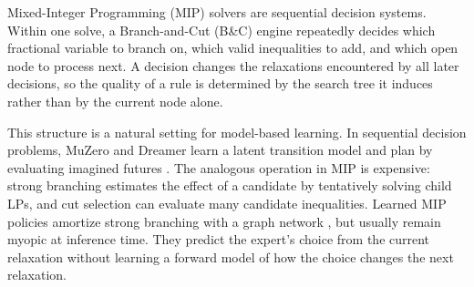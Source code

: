\documentclass{article}
\newcommand{\BnC}{B\&C}
\begin{document}




Mixed-Integer Programming (MIP) solvers are sequential decision systems. Within one solve, a Branch-and-Cut (\BnC) engine repeatedly decides which fractional variable to branch on, which valid inequalities to add, and which open node to process next. A decision changes the relaxations encountered by all later decisions, so the quality of a rule is determined by the search tree it induces rather than by the current node alone.

This structure is a natural setting for model-based learning. In sequential decision problems, MuZero and Dreamer learn a latent transition model and plan by evaluating imagined futures \citep{schrittwieser2020mastering,hafner2020dream}.
The analogous operation in MIP is expensive: strong branching estimates the effect of a candidate by tentatively solving child LPs, and cut selection can evaluate many candidate inequalities. Learned MIP policies amortize strong branching with a graph network \citep{khalil2016learning,gasse2019exact}, but
usually remain myopic at inference time. They predict the expert's choice from the current relaxation without learning a forward model of how the choice changes the next relaxation.
\end{document}
